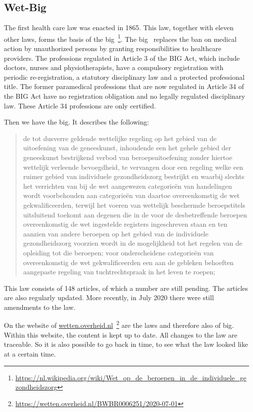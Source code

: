 \subsection{Wet-Big} \label{section:big}
The first health care law was enacted in 1865.
This law, together with eleven other laws, forms the basis of the \acrfull{big}~\footnote{\url{https://nl.wikipedia.org/wiki/Wet_op_de_beroepen_in_de_individuele_gezondheidszorg}}.
The \acrshort{big}~ replaces the ban on medical action by unauthorized persons by granting responsibilities to healthcare providers.
The professions regulated in Article 3 of the BIG Act, which include doctors, nurses and physiotherapists, have a compulsory registration with periodic re-registration, a statutory disciplinary law and a protected professional title.
The former paramedical professions that are now regulated in Article 34 of the BIG Act have no registration obligation and no legally regulated disciplinary law.
These Article 34 professions are only certified.

Then we have the \acrshort{big}.
It describes the following:
\blockquote{de tot dusverre geldende wettelijke regeling op het gebied van de uitoefening van de geneeskunst, inhoudende een het gehele gebied der geneeskunst bestrijkend verbod van beroepsuitoefening zonder hiertoe wettelijk verleende bevoegdheid, te vervangen door een regeling welke een ruimer gebied van individuele gezondheidszorg bestrijkt en waarbij slechts het verrichten van bij de wet
aangewezen categorieën van handelingen wordt voorbehouden aan categorieën van daartoe overeenkomstig de wet gekwalificeerden, terwijl het voeren van wettelijk beschermde beroepstitels uitsluitend toekomt aan degenen die in de voor de desbetreffende beroepen overeenkomstig de wet ingestelde registers ingeschreven staan en ten aanzien van andere beroepen op het gebied van de individuele gezondheidszorg voorzien wordt in de mogelijkheid tot het regelen van de opleiding tot die beroepen; 
\newline
voor onderscheidene categorieën van overeenkomstig de wet gekwalificeerden een aan de gebleken behoeften aangepaste regeling van tuchtrechtspraak in het leven te roepen; }
This law consists of 148 articles, of which a number are still pending.
The articles are also regularly updated.
More recently, in July 2020 there were still amendments to the law.

On the  website of {\url{wetten.overheid.nl}}~\footnote{\url{https://wetten.overheid.nl/BWBR0006251/2020-07-01}} are the laws and therefore also of \acrfull{big}.
Within this website, the content is kept up to date.
All changes to the law are traceable.
So it is also possible to go back in time, to see what the law looked like at a certain time.


